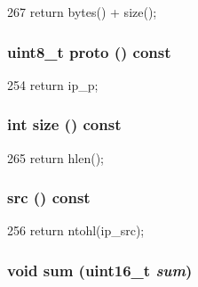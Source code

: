 \begin{DoxyCode}
267 { return bytes() + size(); }
\end{DoxyCode}
\hypertarget{structNet_1_1IpHdr_abb57dba0db48d3e9fea9d5aedf436c3e}{
\subsubsection[{proto}]{\setlength{\rightskip}{0pt plus 5cm}uint8\_\-t proto () const}}
\label{structNet_1_1IpHdr_abb57dba0db48d3e9fea9d5aedf436c3e}



\begin{DoxyCode}
254 { return ip_p; }
\end{DoxyCode}
\hypertarget{structNet_1_1IpHdr_ab8e4e3e2a7bf18888b71bdf9dda0770b}{
\subsubsection[{size}]{\setlength{\rightskip}{0pt plus 5cm}int size () const}}
\label{structNet_1_1IpHdr_ab8e4e3e2a7bf18888b71bdf9dda0770b}



\begin{DoxyCode}
265 { return hlen(); }
\end{DoxyCode}
\hypertarget{structNet_1_1IpHdr_aefa78f6739e5a282710f048091182465}{
\subsubsection[{src}]{ src () const}}
\label{structNet_1_1IpHdr_aefa78f6739e5a282710f048091182465}



\begin{DoxyCode}
256 { return ntohl(ip_src); }
\end{DoxyCode}
\hypertarget{structNet_1_1IpHdr_ae0171ec0578adacce8cceb6a804f97f1}{
\subsubsection[{sum}]{\setlength{\rightskip}{0pt plus 5cm}void sum (uint16\_\-t {\em sum})}}
\label{structNet_1_1IpHdr_ae0171ec0578adacce8cceb6a804f97f1}



